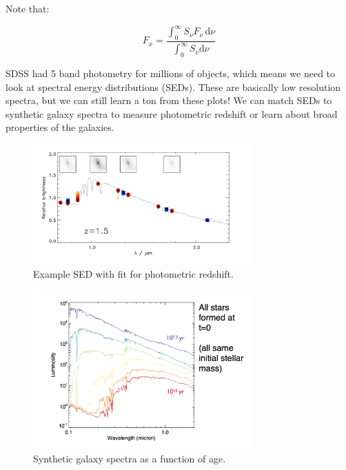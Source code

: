 \documentclass{article}
\begin{document}
Note that:

\begin{equation}
    F_x = \frac{\int_0^{\infty} S_\nu F_\nu \,\mathrm{d}\nu}{\int_0^{\infty} S_\nu \mathrm{d}\nu}
\end{equation}

SDSS had 5 band photometry for millions of objects, which means we need to look at spectral energy distributions (SEDs). These are basically low resolution spectra, but we can still learn a ton from these plots! We can match SEDs to synthetic galaxy spectra to measure photometric redshift or learn about broad properties of the galaxies. 

\begin{figure}
    \centering
    \includegraphics[width=0.75\textwidth]{figs/Screen Shot 2021-08-27 at 2.25.14 PM.png}
    \caption{Example SED with fit for photometric redshift. }
    \label{fig:synth_fit}
\end{figure}

\begin{figure}
    \centering
    \includegraphics[width=0.75\textwidth]{figs/Screen Shot 2021-08-27 at 2.24.29 PM.png}
    \caption{Synthetic galaxy spectra as a function of age. }
    \label{fig:synth_spec}
\end{figure}
\end{document}
